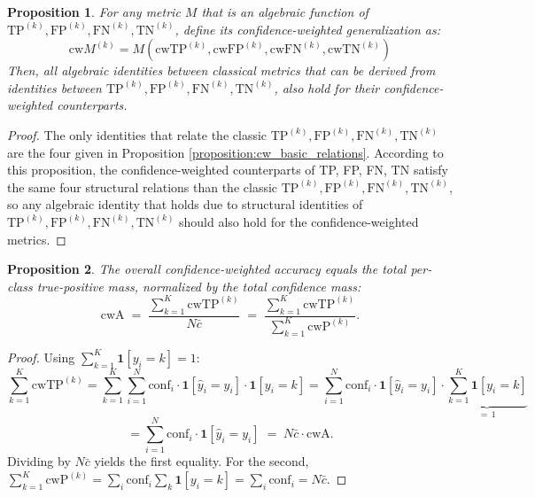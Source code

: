 \documentclass{article}
\theoremstyle{plain}
\newtheorem{theorem}{Proposition}
\theoremstyle{definition}
\theoremstyle{remark}
\begin{document}
\begin{theorem} \label{theorem:generalized_metrics}
For any metric $M$ that is an algebraic function of $\text{TP}^{(k)}, \text{FP}^{(k)}, \text{FN}^{(k)}, \text{TN}^{(k)}$, define its confidence-weighted generalization as: \[
\text{cw}M^{(k)} = M(\text{cwTP}^{(k)}, \text{cwFP}^{(k)}, \text{cwFN}^{(k)}, \text{cwTN}^{(k)}) 
\]
Then, all algebraic identities between classical metrics that can be derived from identities between $\text{TP}^{(k)}, \text{FP}^{(k)}, \text{FN}^{(k)}, \text{TN}^{(k)}$, also hold for their confidence-weighted counterparts.
\end{theorem}
\begin{proof}
The only identities that relate the classic $\text{TP}^{(k)}, \text{FP}^{(k)}, \text{FN}^{(k)}, \text{TN}^{(k)}$ are the four given in Proposition \ref{proposition:cw_basic_relations}.  According to this proposition, the confidence-weighted counterparts of TP, FP, FN, TN satisfy the same four structural relations than the classic $\text{TP}^{(k)}, \text{FP}^{(k)}, \text{FN}^{(k)}, \text{TN}^{(k)}$, so any algebraic identity that holds due to structural identities of $\text{TP}^{(k)}, \text{FP}^{(k)}, \text{FN}^{(k)}, \text{TN}^{(k)}$ should also hold for the confidence-weighted metrics.
\end{proof}
\bigskip


\begin{theorem}  \label{cwa_from_standard_metrics}
\label{theorem:cwA_sum_of_TP}
The overall confidence-weighted accuracy equals the total per-class
true-positive mass, normalized by the total confidence mass:
\[
\text{cwA} \;=\; \frac{\sum_{k=1}^K \text{cwTP}^{(k)}}{N\bar c}
       \;=\; \frac{\sum_{k=1}^K \text{cwTP}^{(k)}}{\sum_{k=1}^K \text{cwP}^{(k)}}.
\]
\end{theorem}
\begin{proof}
Using $\sum_{k=1}^K \mathbf{1}[y_i = k] = 1$: \[
\sum_{k=1}^K \text{cwTP}^{(k)} = \sum_{k=1}^K \sum_{i=1}^N \text{conf}_i \cdot \mathbf{1}[\hat y_i = y_i]\cdot \mathbf{1}[y_i = k] = \sum_{i=1}^N \text{conf}_i \cdot \mathbf{1}[\hat y_i = y_i]\cdot\underbrace{\sum_{k=1}^K \mathbf{1}[y_i = k]}_{=\,1} 
\] \[
= \sum_{i=1}^N \text{conf}_i \cdot \mathbf{1}[\hat y_i = y_i] \;=\; N\bar c \cdot \text{cwA}. 
\]
Dividing by $N\bar c$ yields the first equality. For the second, $\sum_{k=1}^K \text{cwP}^{(k)} = \sum_i \text{conf}_i \sum_k \mathbf{1}[y_i=k] = \sum_i \text{conf}_i = N\bar c$.
\end{proof}
\bigskip
\end{document}
